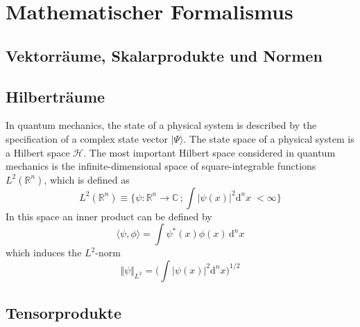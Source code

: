 \documentclass[9pt]{report}
\begin{document}
\newpage
\section{Mathematischer Formalismus}

\subsection{Vektorräume, Skalarprodukte und Normen}
\subsection{Hilberträume}
In quantum mechanics, the state of a physical system is described by the specification of a complex state vector $|\Psi\rangle$. The state space of a physical system is a Hilbert space $\mathcal{H}$. The most important Hilbert space considered in quantum mechanics is the infinite-dimensional space of square-integrable functions $L^2(\mathbb{R}^n)$, which is defined as
\begin{equation}
L^2(\mathbb{R}^n)\equiv\bigg\{\psi:\mathbb{R}^{n}\to\mathbb{C}\,;\int|\psi(x)|^2\mathrm{d}^{n}x\;<\infty\bigg\}
\end{equation}
In this space an inner product can be defined by
\begin{equation}
\langle\psi,\phi\rangle=\int\psi^{*}(x)\phi(x)\,\mathrm{d}^{n}x
\end{equation}
which induces the $L^2$-norm
\begin{equation}
\Vert\psi\Vert_{L^2}=\bigg(\int|\psi(x)|^2\mathrm{d}^{n}x\bigg)^{1/2}
\end{equation}


\subsection{Tensorprodukte}
\end{document}
